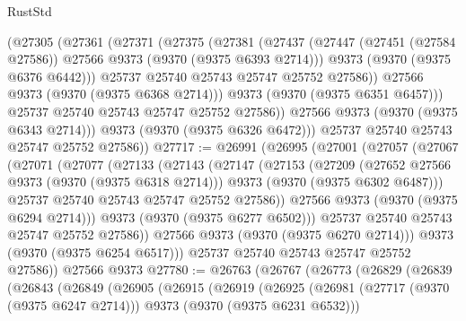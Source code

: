 \begin{lexlean}{RustStd}
\begin{coremodule}
{\begin{coremodule}
{{{{{{{{{{{{{{{{{{{{{{{{{{{{{{{{{{{{{{{              (@27305
                (@27361
                  (@27371
                    (@27375
                      (@27381
                        (@27437
                          (@27447 (@27451 (@27584 @27586)) @27566 @9373 (@9370 (@9375 @6393 @2714)))
                          @9373
                          (@9370 (@9375 @6376 @6442)))
                        @25737
                        @25740
                        @25743
                        @25747
                        @25752
                        @27586))
                    @27566
                    @9373
                    (@9370 (@9375 @6368 @2714)))
                  @9373
                  (@9370 (@9375 @6351 @6457)))
                @25737
                @25740
                @25743
                @25747
                @25752
                @27586))
            @27566
            @9373
            (@9370 (@9375 @6343 @2714)))
          @9373
          (@9370 (@9375 @6326 @6472)))
        @25737
        @25740
        @25743
        @25747
        @25752
        @27586))
@27717 := @26991
    (@26995
      (@27001
        (@27057
          (@27067
            (@27071
              (@27077
                (@27133
                  (@27143
                    (@27147
                      (@27153
                        (@27209
                          (@27652 @27566 @9373 (@9370 (@9375 @6318 @2714)))
                          @9373
                          (@9370 (@9375 @6302 @6487)))
                        @25737
                        @25740
                        @25743
                        @25747
                        @25752
                        @27586))
                    @27566
                    @9373
                    (@9370 (@9375 @6294 @2714)))
                  @9373
                  (@9370 (@9375 @6277 @6502)))
                @25737
                @25740
                @25743
                @25747
                @25752
                @27586))
            @27566
            @9373
            (@9370 (@9375 @6270 @2714)))
          @9373
          (@9370 (@9375 @6254 @6517)))
        @25737
        @25740
        @25743
        @25747
        @25752
        @27586))
    @27566
    @9373
@27780 := @26763
    (@26767
      (@26773
        (@26829
          (@26839
            (@26843
              (@26849
                (@26905
                  (@26915
                    (@26919
                      (@26925
                        (@26981
                          (@27717 (@9370 (@9375 @6247 @2714)))
                          @9373
                          (@9370 (@9375 @6231 @6532)))
}}}}}}}}}}}}}}}}}}}}}}}}}}}}}}}}}}}}}}}
\end{coremodule}}
\end{coremodule}
\end{lexlean}
